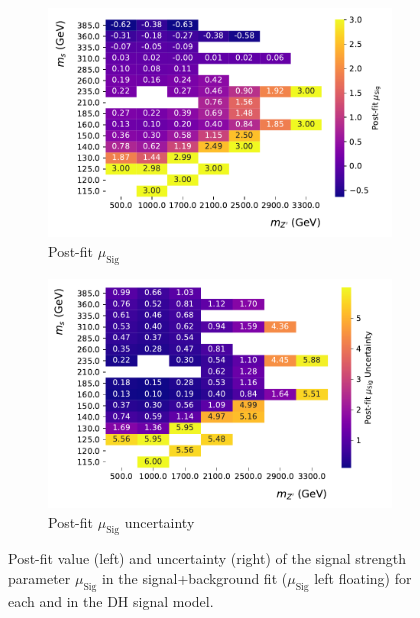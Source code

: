 \begin{figure}[h]
  \centering
  \begin{subfigure}{0.49\textwidth}
    \includegraphics[width=\textwidth]{Figures/8/mu_sigs.pdf}
    \caption{Post-fit \(\mu_\text{Sig}\)}\label{fig:fitted_mu_Sig}
  \end{subfigure} 
  \begin{subfigure}{0.49\textwidth}
    \includegraphics[width=\textwidth]{Figures/8/mu_sig_unc.pdf}
    \caption{Post-fit \(\mu_\text{Sig}\) uncertainty}\label{fig:fitted_mu_Sig_unc}
  \end{subfigure} 
  \caption[]{Post-fit value (left) and uncertainty (right) of the signal strength parameter \(\mu_\text{Sig}\) in the signal+background fit (\(\mu_\text{Sig}\) left floating) for each \ms and \mZp in the DH signal model.}
  \label{fig:fitted_mu_Sig}
\end{figure}

